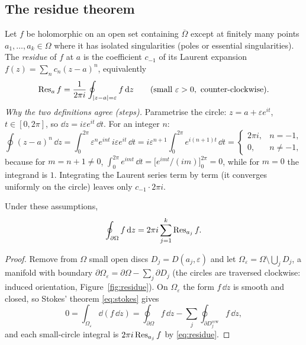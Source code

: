 \subsection{The residue theorem}\label{sec:residue}

Let $f$ be holomorphic on an open set containing $\overline\Omega$ except at finitely many points $a_1,\dots,a_k\in\Omega$ where it has isolated singularities (poles or essential singularities). The \emph{residue} of $f$ at $a$ is the coefficient $c_{-1}$ of its Laurent expansion $f(z)=\sum_nc_n(z-a)^n$, equivalently
\begin{equation}\label{eq:residue}
\Res_af=\frac1{2\pi i}\oint_{|z-a|=\varepsilon}f\,\dd z\qquad(\text{small }\varepsilon>0,\ \text{counter-clockwise}).
\end{equation}
\emph{Why the two definitions agree (steps).} Parametrise the circle: $z=a+\varepsilon e^{it}$, $t\in[0,2\pi]$, so $\dd z=i\varepsilon e^{it}\,\dd t$. For an integer $n$:
\[
\oint(z-a)^n\,\dd z=\int_0^{2\pi}\varepsilon^ne^{int}\,i\varepsilon e^{it}\,\dd t=i\varepsilon^{n+1}\int_0^{2\pi}e^{i(n+1)t}\,\dd t=\begin{cases}2\pi i,&n=-1,\\0,&n\neq-1,\end{cases}
\]
because for $m=n+1\neq0$, $\int_0^{2\pi}e^{imt}\,\dd t=\bigl[e^{imt}/(im)\bigr]_0^{2\pi}=0$, while for $m=0$ the integrand is $1$. Integrating the Laurent series term by term (it converges uniformly on the circle) leaves only $c_{-1}\cdot2\pi i$.



\begin{theorem}\label{thm:residue}
Under these assumptions,
\[
\oint_{\partial\Omega}f\,\mathrm{d} z=2\pi i\sum_{j=1}^k\operatorname{Res}_{a_j}f .
\]
\end{theorem}
\begin{proof}
Remove from $\Omega$ small open discs $D_j=D(a_j,\varepsilon)$ and let $\Omega_\varepsilon=\Omega\setminus\bigcup_jD_j$, a manifold with boundary $\partial\Omega_\varepsilon=\partial\Omega-\sum_j\partial D_j$ (the circles are traversed clockwise: induced orientation, Figure~\ref{fig:residue}). On $\Omega_\varepsilon$ the form $f\,\dd z$ is smooth and closed, so Stokes' theorem \eqref{eq:stokes} gives
\[
0=\int_{\Omega_\varepsilon}\dd(f\,\dd z)=\oint_{\partial\Omega}f\,\dd z-\sum_j\oint_{\partial D_j^{\mathrm{ccw}}}f\,\dd z,
\]
and each small-circle integral is $2\pi i\operatorname{Res}_{a_j}f$ by \eqref{eq:residue}.
\end{proof}

